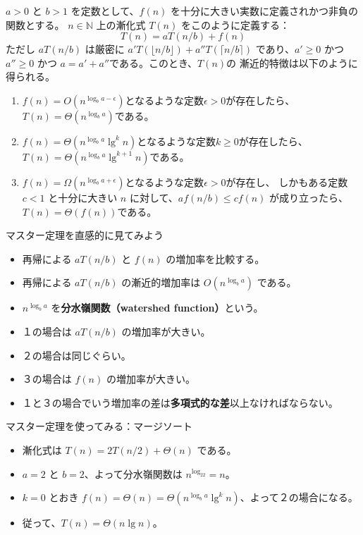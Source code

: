 \documentclass[unicode,11pt,aspectratio=169,notes]{beamer} %
\begin{document}
\begin{frame}
  \begin{theorem}
    $a>0$ と $b>1$ を定数として、$f(n)$ を十分に大きい実数に定義されかつ非負の関数とする。
    $n\in\mathbb{N}$ 上の漸化式 $T(n)$ をこのように定義する：
    \[
      T(n) = aT(n/b)+f(n)
    \]
    ただし $aT(n/b)$ は厳密に $a'T(\lfloor n/b\rfloor)+a''T(\lceil n/b\rceil)$
    であり、$a'\geq0$ かつ $a''\geq0$ かつ $a=a'+a''$である。このとき、$T(n)$の
    漸近的特徴は以下のように得られる。
    \begin{enumerate}
      \item $f(n)=O(n^{\log_ba-\epsilon})$となるような定数$\epsilon >0$が存在したら、
      $T(n)=\Theta(n^{\log_ba})$である。
      \item $f(n)=\Theta(n^{\log_ba}\lg^kn)$となるような定数$k\geq 0$が存在したら、
      $T(n)=\Theta(n^{\log_ba}\lg^{k+1}n)$である。
      \item $f(n)=\Omega(n^{\log_ba+\epsilon})$となるような定数$\epsilon >0$が存在し、
      しかもある定数 $c<1$ と十分に大きい $n$ に対して、$af(n/b)\leq cf(n)$ が成り立ったら、
      $T(n)=\Theta(f(n))$である。
    \end{enumerate}
  \end{theorem}
\end{frame}

\begin{frame}{マスター定理を直感的に見てみよう}
  \begin{itemize}
    \item<+-> 再帰による $aT(n/b)$ と $f(n)$ の増加率を比較する。
    \item<+-> 再帰による $aT(n/b)$ の漸近的増加率は $O(n^{\log_ba})$ である。
    \item<+-> $n^{\log_ba}$ を\textbf{分水嶺関数（watershed function）}という。
    \item<+-> １の場合は $aT(n/b)$ の増加率が大きい。
    \item<+-> ２の場合は同じぐらい。
    \item<+-> ３の場合は $f(n)$ の増加率が大きい。
    \item<+-> １と３の場合でいう増加率の差は\textbf{多項式的な差}以上なければならない。
  \end{itemize}
\end{frame}

\begin{frame}{マスター定理を使ってみる：マージソート}
  \begin{itemize}
    \item<+-> 漸化式は $T(n)=2T(n/2)+\Theta(n)$ である。
    \item<+-> $a=2$ と $b=2$、よって分水嶺関数は $n^{\log_22}=n$。
    \item<+-> $k=0$ とおき $f(n)=\Theta(n)=\Theta(n^{\log_ba}\lg^kn)$、よって２の場合になる。
    \item<+-> 従って、$T(n)=\Theta(n\lg n)$。
  \end{itemize}
\end{frame}
\end{document}
